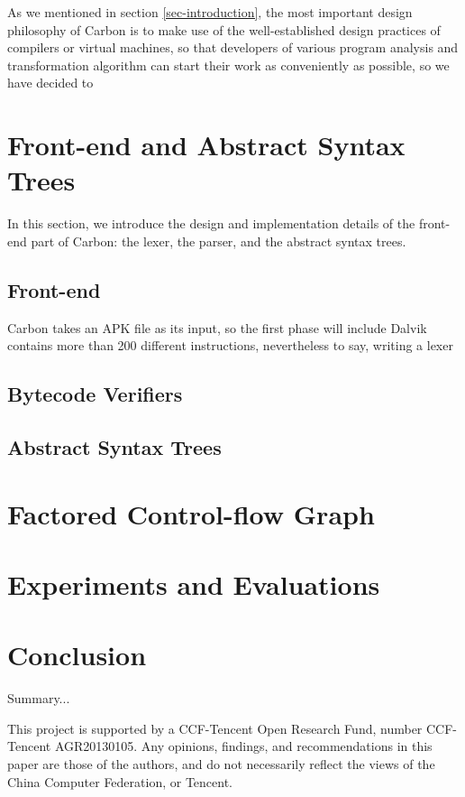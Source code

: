 \documentclass[preprint, cm]{sigplanconf}
\begin{document}
As we mentioned in section \ref{sec-introduction}, the
most important design philosophy of Carbon is to make
use of the well-established design practices of
compilers or virtual machines, so that developers
of various program analysis and transformation algorithm
can start their work as conveniently as possible, so we
have decided to 

\section{Front-end and Abstract Syntax Trees}
In this section, we introduce the design and implementation
details of the front-end part of Carbon: the lexer,
the parser, and the abstract syntax trees.

\subsection{Front-end}
Carbon takes an APK file as its input, so the first phase
will include 
Dalvik contains more than 200 different instructions, nevertheless
to say, writing a lexer

\subsection{Bytecode Verifiers}


\subsection{Abstract Syntax Trees}


\section{Factored Control-flow Graph}\label{sec-cfg}

\section{Experiments and Evaluations}\label{sec-exp}


\section{Conclusion}\label{sec-conclusion}

Summary...

\acks

This project is supported by a CCF-Tencent
Open Research Fund, number CCF-Tencent AGR20130105. Any
opinions, findings, and recommendations in this paper are those
of the authors, and do not
necessarily reflect the views of the China Computer Federation, or
Tencent.
\end{document}
